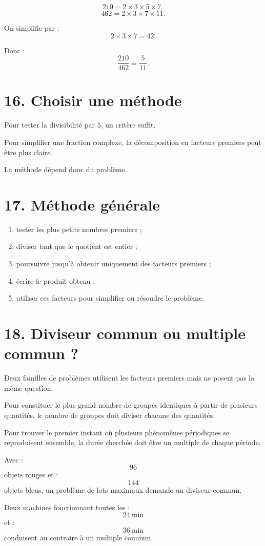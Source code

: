 \[
210=2\times3\times5\times7,
\]
\[
462=2\times3\times7\times11.
\]

On simplifie par :
\[
2\times3\times7=42.
\]

Donc :
\[
\dfrac{210}{462}=\dfrac5{11}.
\]

\section{16. Choisir une méthode}

Pour tester la divisibilité par $5$, un critère suffit.

Pour simplifier une fraction complexe, la décomposition en facteurs premiers peut être plus claire.

La méthode dépend donc du problème.

\section{17. Méthode générale}

\begin{methode}
\begin{enumerate}
\item tester les plus petits nombres premiers ;
\item diviser tant que le quotient est entier ;
\item poursuivre jusqu'à obtenir uniquement des facteurs premiers ;
\item écrire le produit obtenu ;
\item utiliser ces facteurs pour simplifier ou résoudre le problème.
\end{enumerate}
\end{methode}

\section{18. Diviseur commun ou multiple commun ?}

Deux familles de problèmes utilisent les facteurs premiers mais ne posent pas la même question.

Pour constituer le plus grand nombre de groupes identiques à partir de plusieurs quantités, le nombre de groupes doit diviser chacune des quantités.

Pour trouver le premier instant où plusieurs phénomènes périodiques se reproduisent ensemble, la durée cherchée doit être un multiple de chaque période.

\begin{exemple}
Avec :
\[
96
\]
objets rouges et :
\[
144
\]
objets bleus, un problème de lots maximaux demande un diviseur commun.

Deux machines fonctionnant toutes les :
\[
24\ \text{min}
\]
et :
\[
36\ \text{min}
\]
conduisent au contraire à un multiple commun.
\end{exemple}

